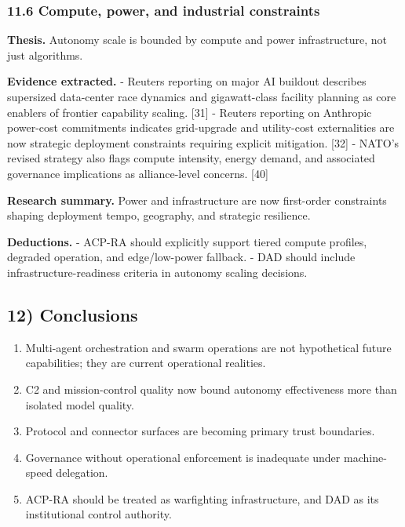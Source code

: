 \documentclass[11pt]{article}
\begin{document}
\hypertarget{compute-power-and-industrial-constraints}{%
\subsubsection{11.6 Compute, power, and industrial
constraints}\label{compute-power-and-industrial-constraints}}

\textbf{Thesis.} Autonomy scale is bounded by compute and power
infrastructure, not just algorithms.

\textbf{Evidence extracted.} - Reuters reporting on major AI buildout
describes supersized data-center race dynamics and gigawatt-class
facility planning as core enablers of frontier capability scaling.
{[}31{]} - Reuters reporting on Anthropic power-cost commitments
indicates grid-upgrade and utility-cost externalities are now strategic
deployment constraints requiring explicit mitigation. {[}32{]} - NATO's
revised strategy also flags compute intensity, energy demand, and
associated governance implications as alliance-level concerns. {[}40{]}

\textbf{Research summary.} Power and infrastructure are now first-order
constraints shaping deployment tempo, geography, and strategic
resilience.

\textbf{Deductions.} - ACP-RA should explicitly support tiered compute
profiles, degraded operation, and edge/low-power fallback. - DAD should
include infrastructure-readiness criteria in autonomy scaling decisions.

\hypertarget{conclusions}{%
\subsection{12) Conclusions}\label{conclusions}}

\begin{enumerate}
\def\labelenumi{\arabic{enumi}.}
\tightlist
\item
  Multi-agent orchestration and swarm operations are not hypothetical
  future capabilities; they are current operational realities.
\item
  C2 and mission-control quality now bound autonomy effectiveness more
  than isolated model quality.
\item
  Protocol and connector surfaces are becoming primary trust boundaries.
\item
  Governance without operational enforcement is inadequate under
  machine-speed delegation.
\item
  ACP-RA should be treated as warfighting infrastructure, and DAD as its
  institutional control authority.
\end{enumerate}
\end{document}
